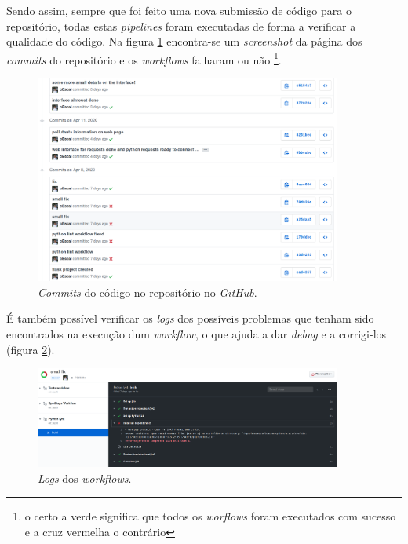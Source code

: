 Sendo assim, sempre que foi feito uma nova submissão de código para o repositório, todas estas \textit{pipelines} foram executadas de forma a verificar a qualidade do código. Na figura \ref{fig:commits} encontra-se um \textit{screenshot} da página dos \textit{commits} do repositório e os \textit{workflows} falharam ou não \footnote{o certo a verde significa que todos os \textit{worflows} foram executados com sucesso e a cruz vermelha o contrário}.

\begin{figure}[h]
   \centering
   \includegraphics[width=0.90\textwidth]{images/commits}
   \caption{\textit{Commits} do código no repositório no \textit{GitHub}.}
   \label{fig:commits}
\end{figure}

É também possível verificar os \textit{logs} dos possíveis problemas que tenham sido encontrados na execução dum \textit{workflow}, o que ajuda a dar \textit{debug} e a corrigi-los (figura \ref{fig:logs}).

\begin{figure}[h]
   \centering
   \includegraphics[width=0.90\textwidth]{images/logs}
   \caption{\textit{Logs} dos \textit{workflows}.}
   \label{fig:logs}
\end{figure}
